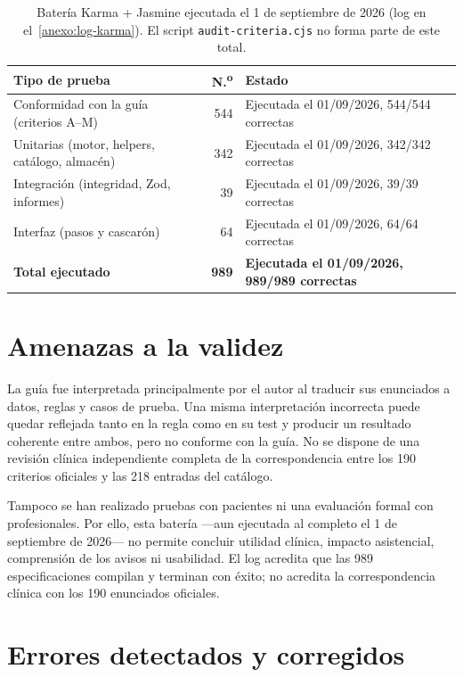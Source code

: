 \begin{table}[H]
  \centering
  \scriptsize
  \begin{tabular}{@{}lr>{\raggedright\arraybackslash}p{5.4cm}@{}}
    \toprule
    \textbf{Tipo de prueba} & \textbf{N.\textsuperscript{o}} & \textbf{Estado} \\
    \midrule
    Conformidad con la guía (criterios A--M) & 544 & Ejecutada el 01/09/2026, 544/544 correctas \\
    Unitarias (motor, helpers, catálogo, almacén) & 342 & Ejecutada el 01/09/2026, 342/342 correctas \\
    Integración (integridad, Zod, informes) & 39 & Ejecutada el 01/09/2026, 39/39 correctas \\
    Interfaz (pasos y cascarón) & 64 & Ejecutada el 01/09/2026, 64/64 correctas \\
    \midrule
    \textbf{Total ejecutado} & \textbf{989} & \textbf{Ejecutada el 01/09/2026, 989/989 correctas} \\
    \bottomrule
  \end{tabular}
  \caption{Batería Karma + Jasmine ejecutada el 1 de septiembre de 2026
  (log en el~\cref{anexo:log-karma}). El script
  \texttt{audit-criteria.cjs} no forma parte de este total.}
  \label{tab:pruebas}
\end{table}

\section{Amenazas a la validez}

La guía fue interpretada principalmente por el autor al traducir sus
enunciados a datos, reglas y casos de prueba. Una misma interpretación
incorrecta puede quedar reflejada tanto en la regla como en su test y producir
un resultado coherente entre ambos, pero no conforme con la guía. No se dispone
de una revisión clínica independiente completa de la correspondencia entre los
190 criterios oficiales y las 218 entradas del catálogo.

Tampoco se han realizado pruebas con pacientes ni una evaluación formal con
profesionales. Por ello, esta batería ---aun ejecutada al completo el
1 de septiembre de 2026--- no permite concluir utilidad clínica,
impacto asistencial, comprensión de los avisos ni usabilidad. El log
acredita que las 989 especificaciones compilan y terminan con éxito; no
acredita la correspondencia clínica con los 190 enunciados oficiales.

\section{Errores detectados y corregidos}
\label{sec:errores-detectados}

